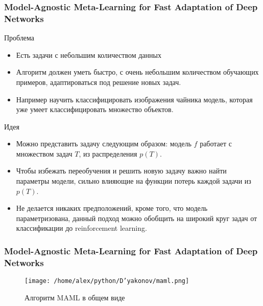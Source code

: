 \documentclass[fleqn, xcolor=x11names]{beamer}
\begin{document}
\begin{frame}\frametitle{Model-Agnostic Meta-Learning for Fast Adaptation of Deep Networks}
{\footnotesize 
\begin{block}{Проблема}
\begin{itemize}
\item Есть задачи с небольшим количеством данных
\item Алгоритм должен уметь быстро, с очень небольшим количеством обучающих примеров, адаптироваться под решение новых задач. \item Например научить классифицировать изображения чайника модель, которая уже умеет классифицировать множество объектов.

\end{itemize}

\end{block}
\begin{block}{Идея}

\begin{itemize}
\item Можно представить задачу следующим образом: модель $f$ работает с множеством задач $T$, из распределения $p(T)$. 
\item Чтобы избежать переобучения и решить новую задачу важно найти параметры модели, сильно влияющие на функции потерь каждой задачи из $p(T)$.
\item Не делается никаких предположений, кроме того, что модель параметризована, данный подход можно обобщить на широкий круг задач от классификации до reinforcement learning. 
\end{itemize}
\end{block}
}
\end{frame}

\begin{frame}\frametitle{Model-Agnostic Meta-Learning for Fast Adaptation of Deep Networks}

\begin{figure}[h]
\begin{center}
\texttt{[image: /home/alex/python/D'yakonov/maml.png]}
\caption{ Алгоритм MAML в общем виде}
\end{center}
\end{figure}

\end{frame}
\end{document}
